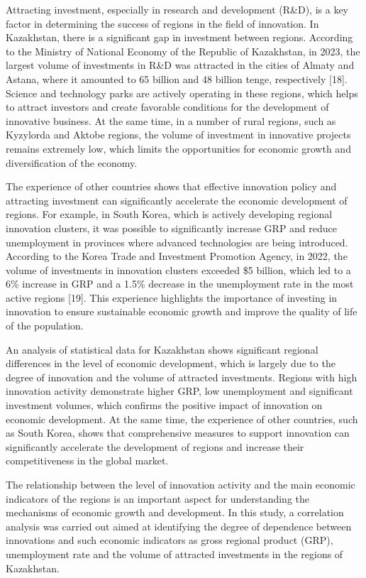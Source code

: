 \begin{multicols}{2}
Attracting investment, especially in research and development (R\&D), is
a key factor in determining the success of regions in the field of
innovation. In Kazakhstan, there is a significant gap in investment
between regions. According to the Ministry of National Economy of the
Republic of Kazakhstan, in 2023, the largest volume of investments in
R\&D was attracted in the cities of Almaty and Astana, where it amounted
to 65 billion and 48 billion tenge, respectively {[}18{]}. Science and
technology parks are actively operating in these regions, which helps to
attract investors and create favorable conditions for the development of
innovative business. At the same time, in a number of rural regions,
such as Kyzylorda and Aktobe regions, the volume of investment in
innovative projects remains extremely low, which limits the
opportunities for economic growth and diversification of the economy.

The experience of other countries shows that effective innovation policy
and attracting investment can significantly accelerate the economic
development of regions. For example, in South Korea, which is actively
developing regional innovation clusters, it was possible to
significantly increase GRP and reduce unemployment in provinces where
advanced technologies are being introduced. According to the Korea Trade
and Investment Promotion Agency, in 2022, the volume of investments in
innovation clusters exceeded \$5 billion, which led to a 6\% increase in
GRP and a 1.5\% decrease in the unemployment rate in the most active
regions {[}19{]}. This experience highlights the importance of investing
in innovation to ensure sustainable economic growth and improve the
quality of life of the population.

An analysis of statistical data for Kazakhstan shows significant
regional differences in the level of economic development, which is
largely due to the degree of innovation and the volume of attracted
investments. Regions with high innovation activity demonstrate higher
GRP, low unemployment and significant investment volumes, which confirms
the positive impact of innovation on economic development. At the same
time, the experience of other countries, such as South Korea, shows that
comprehensive measures to support innovation can significantly
accelerate the development of regions and increase their competitiveness
in the global market.

The relationship between the level of innovation activity and the main
economic indicators of the regions is an important aspect for
understanding the mechanisms of economic growth and development. In this
study, a correlation analysis was carried out aimed at identifying the
degree of dependence between innovations and such economic indicators as
gross regional product (GRP), unemployment rate and the volume of
attracted investments in the regions of Kazakhstan.


\end{multicols}
